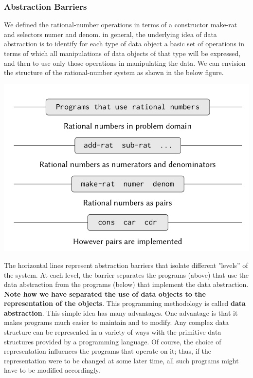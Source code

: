\documentclass[a4paper,twoside]{article}
\numberwithin{equation}{section}
\begin{document}
\subsubsection{Abstraction Barriers}
We defined the rational-number operations in terms of a constructor make-rat and selectors numer and denom.
in general, the underlying idea of data abstraction is to identify for each type of data object a basic set of operations in terms of which all manipulations of data objects of that type will be expressed, and then to use only those operations in manipulating the data. We can envision the structure of the rational-number system as
shown in the below figure.
\begin{center}
    \includegraphics[scale=0.2]{assets/data_abstraction.png}
\end{center}
The horizontal lines represent abstraction barriers that isolate different "levels” of the system.
At each level, the barrier separates the programs (above) that use the data abstraction from the
programs (below) that implement the data abstraction. \textbf{Note how we have separated the use of
data objects to the representation of the objects}. This programming methodology is called
\textbf{data abstraction}. This simple idea has many advantages. One advantage is that it makes
programs much easier to maintain and to modify. Any complex data structure can be represented in a
variety of ways with the primitive data structures provided by a programming language. Of course,
the choice of representation inﬂuences the programs that operate on it; thus, if the representation
were to be changed at some later time, all such programs might have to be modified accordingly. \newline
\end{document}
